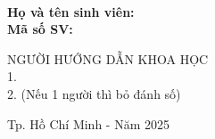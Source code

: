 \begin{titlepage}
\begin{center}
{ \Large \bfseries \tenKL \\[2cm] } 

{\bfseries Họ và tên sinh viên: \tenSV\\
Mã số SV: \mssv\\[2cm]}


NGƯỜI HƯỚNG DẪN KHOA HỌC\\
1. \tenGVHD \\
2. (Nếu 1 người thì bỏ đánh số)




\vfill
Tp. Hồ Chí Minh - Năm 2025

\end{center}
\thispagestyle{empty}

\myemptypage

\end{titlepage}
\hypersetup{pageanchor=true}